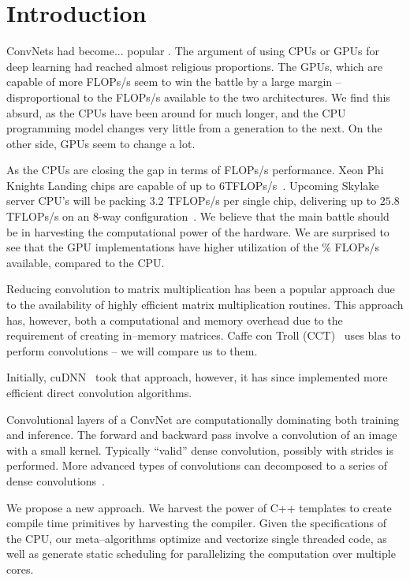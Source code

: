 \section{Introduction}

  ConvNets had become... popular .
  The argument of using CPUs or GPUs for deep learning had reached
  almost religious proportions.  The GPUs, which are capable of more
  FLOPs/s seem to win the battle by a large margin -- disproportional
  to the FLOPs/s available to the two architectures.  We find this
  absurd, as the CPUs have been around for much longer, and the CPU
  programming model changes very little from a generation to the next.
  On the other side, GPUs seem to change a lot.

  As the CPUs are closing the gap in terms of FLOPs/s performance.
  Xeon Phi Knights Landing chips are capable of up to
  6TFLOPs/s~\cite{}.  Upcoming Skylake server CPU's will be packing
  $3.2$ TFLOPs/s per single chip, delivering up to $25.8$ TFLOPs/s on
  an 8-way configuration~\cite{}.  We believe that the main battle
  should be in harvesting the computational power of the hardware.  We
  are surprised to see that the GPU implementations have higher
  utilization of the \% FLOPs/s available, compared to the CPU.

  Reducing convolution to matrix multiplication has been a popular
  approach due to the availability of highly efficient matrix
  multiplication routines.  This approach has, however, both a
  computational and memory overhead due to the requirement of creating
  in--memory matrices.  Caffe con Troll (CCT)~\cite{hadjis2015shallow}
  uses blas to perform convolutions -- we will compare us to them.

  Initially, cuDNN~\cite{chetlur2014cudnn} took that approach,
  however, it has since implemented more efficient direct convolution
  algorithms.

  Convolutional layers of a ConvNet are computationally dominating
  both training and inference.  The forward and backward pass involve
  a convolution of an image with a small kernel.  Typically ``valid''
  dense convolution, possibly with strides is performed.  More
  advanced types of convolutions can decomposed to a series of dense
  convolutions~\cite{szegedy2015going}.

  We propose a new approach.  We harvest the power of C++ templates to
  create compile time primitives by harvesting the compiler.  Given
  the specifications of the CPU, our meta--algorithms optimize and
  vectorize single threaded code, as well as generate static
  scheduling for parallelizing the computation over multiple cores.

